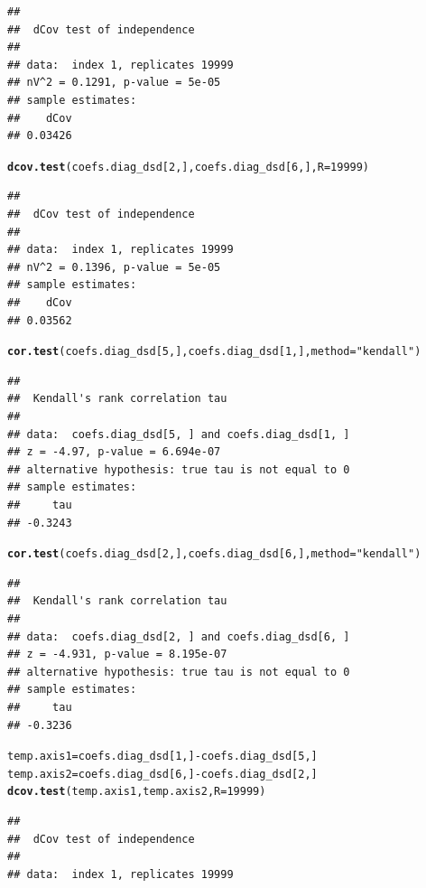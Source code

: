 \documentclass{article}\usepackage[]{graphicx}\usepackage[]{color}
\makeatletter
\newcommand{\hlnum}[1]{\textcolor[rgb]{0.686,0.059,0.569}{#1}}%
\newcommand{\hlstr}[1]{\textcolor[rgb]{0.192,0.494,0.8}{#1}}%
\newcommand{\hlopt}[1]{\textcolor[rgb]{0,0,0}{#1}}%
\newcommand{\hlstd}[1]{\textcolor[rgb]{0.345,0.345,0.345}{#1}}%
\newcommand{\hlkwb}[1]{\textcolor[rgb]{0.69,0.353,0.396}{#1}}%
\newcommand{\hlkwc}[1]{\textcolor[rgb]{0.333,0.667,0.333}{#1}}%
\newcommand{\hlkwd}[1]{\textcolor[rgb]{0.737,0.353,0.396}{\textbf{#1}}}%
\newenvironment{kframe}{%
 \def\at@end@of@kframe{}%
 \ifinner\ifhmode%
  \def\at@end@of@kframe{\end{minipage}}%
  \begin{minipage}{\columnwidth}%
 \fi\fi%
 \def\FrameCommand##1{\hskip\@totalleftmargin \hskip-\fboxsep
 \colorbox{shadecolor}{##1}\hskip-\fboxsep
     \hskip-\linewidth \hskip-\@totalleftmargin \hskip\columnwidth}%
 \MakeFramed {\advance\hsize-\width
   \@totalleftmargin\z@ \linewidth\hsize
   \@setminipage}}%
 {\par\unskip\endMakeFramed%
 \at@end@of@kframe}
\newenvironment{knitrout}{}{} %
\makeatother
\begin{document}
\begin{knitrout}
\begin{kframe}
\begin{alltt}
\end{alltt}
\begin{verbatim}
## 
## 	dCov test of independence
## 
## data:  index 1, replicates 19999
## nV^2 = 0.1291, p-value = 5e-05
## sample estimates:
##    dCov 
## 0.03426
\end{verbatim}
\begin{alltt}
\hlkwd{dcov.test}\hlstd{(coefs.diag_dsd[}\hlnum{2}\hlstd{, ], coefs.diag_dsd[}\hlnum{6}\hlstd{, ],} \hlkwc{R} \hlstd{=} \hlnum{19999}\hlstd{)}
\end{alltt}
\begin{verbatim}
## 
## 	dCov test of independence
## 
## data:  index 1, replicates 19999
## nV^2 = 0.1396, p-value = 5e-05
## sample estimates:
##    dCov 
## 0.03562
\end{verbatim}
\begin{alltt}
\hlkwd{cor.test}\hlstd{(coefs.diag_dsd[}\hlnum{5}\hlstd{, ], coefs.diag_dsd[}\hlnum{1}\hlstd{, ],} \hlkwc{method} \hlstd{=} \hlstr{"kendall"}\hlstd{)}
\end{alltt}
\begin{verbatim}
## 
## 	Kendall's rank correlation tau
## 
## data:  coefs.diag_dsd[5, ] and coefs.diag_dsd[1, ]
## z = -4.97, p-value = 6.694e-07
## alternative hypothesis: true tau is not equal to 0
## sample estimates:
##     tau 
## -0.3243
\end{verbatim}
\begin{alltt}
\hlkwd{cor.test}\hlstd{(coefs.diag_dsd[}\hlnum{2}\hlstd{, ], coefs.diag_dsd[}\hlnum{6}\hlstd{, ],} \hlkwc{method} \hlstd{=} \hlstr{"kendall"}\hlstd{)}
\end{alltt}
\begin{verbatim}
## 
## 	Kendall's rank correlation tau
## 
## data:  coefs.diag_dsd[2, ] and coefs.diag_dsd[6, ]
## z = -4.931, p-value = 8.195e-07
## alternative hypothesis: true tau is not equal to 0
## sample estimates:
##     tau 
## -0.3236
\end{verbatim}
\begin{alltt}
\hlstd{temp.axis1} \hlkwb{=} \hlstd{coefs.diag_dsd[}\hlnum{1}\hlstd{, ]} \hlopt{-} \hlstd{coefs.diag_dsd[}\hlnum{5}\hlstd{, ]}
\hlstd{temp.axis2} \hlkwb{=} \hlstd{coefs.diag_dsd[}\hlnum{6}\hlstd{, ]} \hlopt{-} \hlstd{coefs.diag_dsd[}\hlnum{2}\hlstd{, ]}
\hlkwd{dcov.test}\hlstd{(temp.axis1, temp.axis2,} \hlkwc{R} \hlstd{=} \hlnum{19999}\hlstd{)}
\end{alltt}
\begin{verbatim}
## 
## 	dCov test of independence
## 
## data:  index 1, replicates 19999

\end{verbatim}
\end{kframe}
\end{knitrout}
\end{document}
